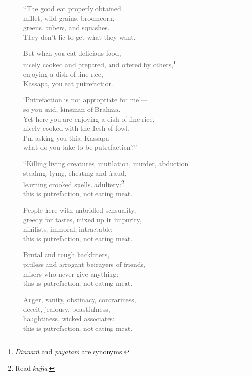 \documentclass[12pt,openany]{book}%
\begin{document}
\begin{verse}%
“The good eat properly obtained \\
millet, wild grains, broomcorn, \\
greens, tubers, and squashes. \\
They don’t lie to get what they want. 

But when you eat delicious food, \\
nicely cooked and prepared, and offered by others,\footnote{\textit{\textsanskrit{Dinnaṁ}} and \textit{\textsanskrit{payataṁ}} are synonyms. } \\
enjoying a dish of fine rice, \\
Kassapa, you eat putrefaction. 

‘Putrefaction is not appropriate for me’—\\
so you said, kinsman of \textsanskrit{Brahmā}. \\
Yet here you are enjoying a dish of fine rice, \\
nicely cooked with the flesh of fowl. \\
I’m asking you this, Kassapa: \\
what do you take to be putrefaction?” 

“Killing living creatures, mutilation, murder, abduction; \\
stealing, lying, cheating and fraud, \\
learning crooked spells, adultery:\footnote{Read \textit{kujja}. } \\
this is putrefaction, not eating meat. 

People here with unbridled sensuality, \\
greedy for tastes, mixed up in impurity, \\
nihilists, immoral, intractable: \\
this is putrefaction, not eating meat. 

Brutal and rough backbiters, \\
pitiless and arrogant betrayers of friends, \\
misers who never give anything: \\
this is putrefaction, not eating meat. 

Anger, vanity, obstinacy, contrariness, \\
deceit, jealousy, boastfulness, \\
haughtiness, wicked associates: \\
this is putrefaction, not eating meat. 


\end{verse}
\end{document}
